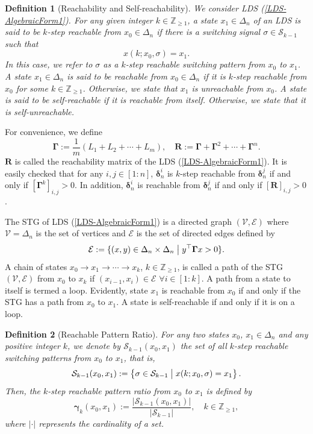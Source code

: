 \documentclass[11pt,onecolumn]{article}
\newtheorem{definition}{Definition}
\newcommand{\ddelta}{{\boldsymbol\delta}}
\begin{document}
    \begin{definition}[Reachability and Self-reachability]We consider LDS (\ref{LDS-AlgebraicForm1}).
   For any given integer $k\in\mathbb Z_{\geq1}$, a state $x_1\in\Delta_n$ of an LDS is said to be $k$-step reachable from $x_0\in\Delta_n$ if there is a switching signal $\sigma\in\mathcal S_{k-1}$  such that
   \[x(k;x_0,\sigma)=x_1.\]
In this case, we refer to $\sigma$ as a $k$-step reachable switching pattern from $ x_0$ to $x_1$.
   A state $x_1\in\Delta_n$ is said to be reachable from $x_0\in\Delta_n$ if it is $k$-step reachable from $x_0$  for some $k\in\mathbb Z_{\geq1}$. Otherwise, we state that $x_1$ is unreachable from $x_0$.
   A state is said to be self-reachable if it is reachable from itself.
   Otherwise, we state that it is self-unreachable.
\end{definition}

For convenience, we define
 \[ \boldsymbol\Gamma:=\frac{1}{m}(L_1+L_2+\cdots+L_m),
\quad\mathbf R:= \boldsymbol\Gamma+\boldsymbol\Gamma^2+\cdots +\boldsymbol\Gamma^n. \]
$\mathbf R$ is called the reachability matrix of the LDS (\ref{LDS-AlgebraicForm1}). It is easily checked that for any $i,j\in[1:n]$, $\ddelta_n^i$ is $k$-step reachable from $\ddelta_n^j$ if and only if $[\boldsymbol\Gamma^k]_{i,j}>0$. In addition, $\ddelta_n^i$ is reachable from $\ddelta_n^j$ if and only if $[\mathbf R]_{i,j}>0$.

The STG of LDS (\ref{LDS-AlgebraicForm1}) is a directed graph $(\mathcal V,\mathcal E)$ where $\mathcal V=\Delta_n$ is the set of vertices and $\mathcal E$ is the set of directed edges defined by
\[\mathcal E:=\{(x,y)\in\Delta_n\times\Delta_n\bigm| y^\top \boldsymbol\Gamma x>0\}.\]
A chain of states $x_0\rightarrow x_1\rightarrow\cdots\rightarrow x_k$, $k\in\mathbb Z_{\geq1}$, is called a path of the STG $(\mathcal V,\mathcal E)$ from $x_0$ to $x_k$ if $(x_{i-1},x_i)\in\mathcal E $ $\forall i\in[1:k]$. A path from a state to itself is termed a loop.
Evidently,  state $x_1$ is reachable from $x_0$ if and only if the STG has a path from $x_0$ to $x_1$. A state is self-reachable if and only if it is on a loop.

  \begin{definition}[Reachable Pattern Ratio]\label{DefinitionRotio}
     For any two states $x_0$, $x_1\in\Delta_n$ and any positive integer $k$, we denote by $\mathcal S_{k-1}(x_0,x_1)$ the set of all $k$-step reachable switching patterns from $x_0$ to $x_1$, that is,
     \[\mathcal S_{k-1}(x_0,x_1):=\left\{\sigma\in\mathcal S_{k-1}\bigm| x(k;x_0,\sigma)= x_1\right\}.\]
 Then, the $k$-step reachable pattern ratio from $x_0$ to $x_1$ is defined by
\[\boldsymbol\gamma_k(x_0,x_1):=\frac{|\mathcal S_{k-1}(x_0, x_1)|}{|\mathcal S_{k-1}|},\quad k\in\mathbb Z_{\geq1},\]
where $|\cdot|$ represents the cardinality of a set.
  \end{definition}
\end{document}
